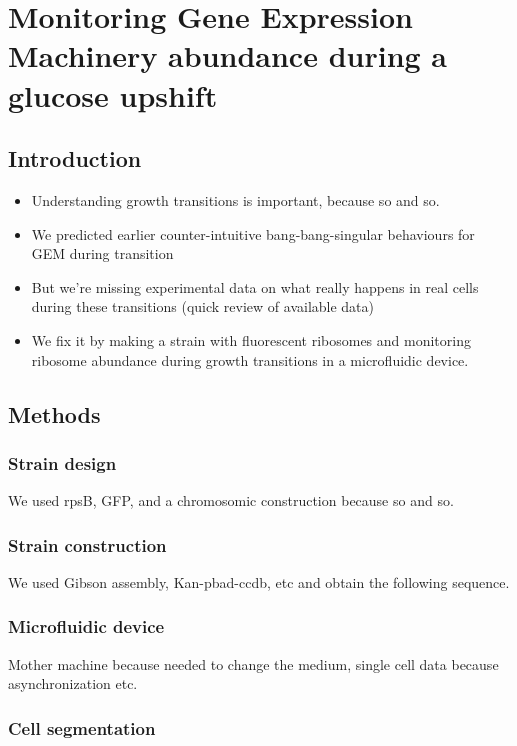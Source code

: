 \chapter{Monitoring Gene Expression Machinery abundance during a glucose upshift}

\section{Introduction}

\begin{itemize}
\item Understanding growth transitions is important, because so and so.
\item We predicted earlier counter-intuitive bang-bang-singular behaviours for GEM during transition
\item But we're missing experimental data on what really happens in real cells during these transitions (quick review of available data)
\item We fix it by making a strain with fluorescent ribosomes and monitoring ribosome abundance during growth transitions in a microfluidic device.
\end{itemize}

\section{Methods}

\subsection{Strain design}

We used rpsB, GFP, and a chromosomic construction because so and so.

\subsection{Strain construction}

We used Gibson assembly, Kan-pbad-ccdb, etc and obtain the following sequence.

\subsection{Microfluidic device}

Mother machine because needed to change the medium, single cell data because asynchronization etc.

\subsection{Cell segmentation}


